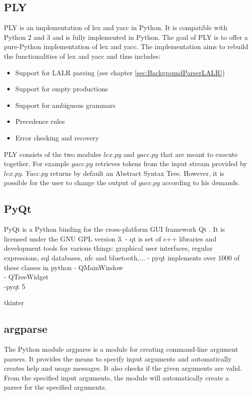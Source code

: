 \subsection{PLY}\label{sec:BackgroundPythonPLY}

\acf{PLY} is an implementation of lex and yacc in Python. It is compatible with Python 2 and 3 and is fully implemented in Python. The goal of \ac{PLY} is to offer a pure-Python implementation of lex and yacc. The implementation aims to rebuild the functionalities of lex and yacc and thus includes:
\begin{itemize}
\item Support for LALR parsing (see chapter \ref{sec:BackgroundParserLALR})
\item Support for empty productions
\item Support for ambiguous grammars 
\item Precedence rules
\item Error checking and recovery
\end{itemize}

\ac{PLY} consists of the two modules $lex.py$ and $yacc.py$ that are meant to execute together. For example $yacc.py$ retrieves tokens from the input stream provided by $lex.py$. $Yacc.py$ returns by default an Abstract Syntax Tree. However, it is possible for the user to change the output of $yacc.py$ according to his demands.

\cite{PLY}


\subsection{PyQt}\label{sec:BackgroundPytonPyQt}

PyQt is a Python binding for the cross-platform GUI framework Qt \cite{PyQt}.
It is licensed under the GNU GPL version 3.
- qt is set of c++ libraries and development tools for various things: graphical user interfaces, regular expressions, sql databases, nfc and bluetooth,...
- pyqt implements over 1000 of these classes in python
- QMainWindow \\
- QTreeWidget \\
-pyqt 5

tkinter

\subsection{argparse}\label{sec:BackgroundArgparse}

The Python module argparse is a module for creating command-line argument parsers.
It provides the means to specify input arguments and automatically creates help and usage messages.
It also checks if the given arguments are valid.
From the specified input arguments, the module will automatically create a parser for the specified arguments. \cite{argparse} 

